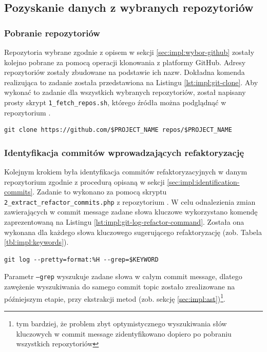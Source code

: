 \documentclass[12pt]{report}
\begin{document}
\subsection{Pozyskanie danych z wybranych repozytoriów}
\subsubsection{Pobranie repozytoriów}
Repozytoria wybrane zgodnie z opisem w sekcji \ref{sec:impl:wybor-github} zostały kolejno pobrane za pomocą operacji klonowania z platformy GitHub. Adresy repozytoriów zostały zbudowane na podstawie ich nazw. Dokładna komenda realizująca to zadanie została przedstawiona na Listingu \ref{lst:impl:git-clone}. Aby wykonać to zadanie dla wszystkich wybranych repozytoriów, został napisany prosty skrypt \texttt{1\_fetch\_repos.sh}, którego źródła można podglądnąć w repozytorium \cite{fracz:refactor-extractor}.

\begin{lstlisting}[frame=single,caption={Komenda klonująca wybrane repozytoria},captionpos=b,label={lst:impl:git-clone}]
git clone https://github.com/$PROJECT_NAME repos/$PROJECT_NAME
\end{lstlisting}

\subsubsection{Identyfikacja commitów wprowadzających refaktoryzację}
Kolejnym krokiem była identyfikacja commitów refaktoryzacyjnych w danym repozytorium zgodnie z procedurą opisaną w sekcji \ref{sec:impl:identification-commits}. Zadanie to wykonano za pomocą skryptu \texttt{2\_extract\_refactor\_commits.php} z repozytorium \cite{fracz:refactor-extractor}. W celu odnalezienia zmian zawierających w commit message zadane słowa kluczowe wykorzystano komendę zaprezentowaną na Listingu \ref{lst:impl:git-log-refactor-command}. Została ona wykonana dla każdego słowa kluczowego sugerującego refaktoryzację (zob. Tabela \ref{tbl:impl:keywords}).

\begin{lstlisting}[frame=single,caption={Komenda wyszukująca w repozytorium commity z zadanym słowem kluczowym w commit message},captionpos=b,label={lst:impl:git-log-refactor-command}]
git log --pretty=format:%H --grep=$KEYWORD
\end{lstlisting}

Parametr \texttt{--grep} wyszukuje zadane słowa w całym commit message, dlatego zawężenie wyszukiwania do samego commit topic zostało zrealizowane na późniejszym etapie, przy ekstrakcji metod (zob. sekcję \ref{sec:impl:ast})\footnote{tym bardziej, że problem zbyt optymistycznego wyszukiwania słów kluczowych w commit message zidentyfikowano dopiero po pobraniu wszystkich repozytoriów}. 
\end{document}
